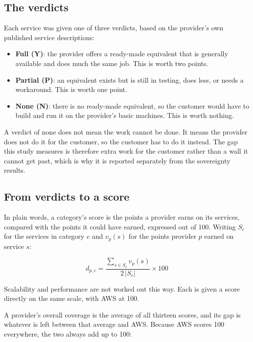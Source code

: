\subsection*{The verdicts}

Each service was given one of three verdicts, based on the provider's own published
service descriptions:

\begin{itemize}
  \item \textbf{Full (Y)}: the provider offers a ready-made equivalent that is
        generally available and does much the same job. This is worth two points.
  \item \textbf{Partial (P)}: an equivalent exists but is still in testing, does
        less, or needs a workaround. This is worth one point.
  \item \textbf{None (N)}: there is no ready-made equivalent, so the customer would
        have to build and run it on the provider's basic machines. This is worth
        nothing.
\end{itemize}

A verdict of none does not mean the work cannot be done. It means the provider does
not do it for the customer, so the customer has to do it instead. The gap this study
measures is therefore extra work for the customer rather than a wall it cannot get
past, which is why it is reported separately from the sovereignty results.

\subsection*{From verdicts to a score}

In plain words, a category's score is the points a provider earns on its services,
compared with the points it could have earned, expressed out of 100. Writing $S_c$
for the services in category $c$ and $v_p(s)$ for the points provider $p$ earned on
service $s$:

\begin{equation}
  \label{eq:readiness-dimension}
  d_{p,c} = \frac{\displaystyle\sum_{s \in S_c} v_p(s)}{2\,\lvert S_c \rvert}
            \times 100
\end{equation}

Scalability and performance are not worked out this way. Each is given a score
directly on the same scale, with \acs{AWS} at 100.

A provider's overall coverage is the average of all thirteen scores, and its gap is
whatever is left between that average and \acs{AWS}. Because \acs{AWS} scores 100
everywhere, the two always add up to 100:

